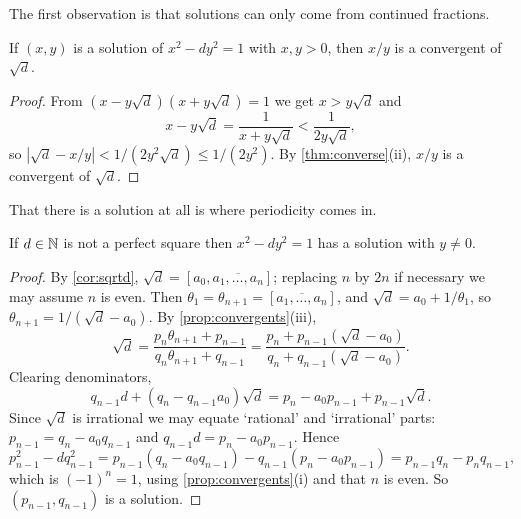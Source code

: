 \documentclass[a4paper]{scrartcl}
\begin{document}
The first observation is that solutions can only come from continued fractions.

\begin{proposition}\label{prop:pellconv}
	If $(x,y)$ is a solution of $x^2 - dy^2 = 1$ with $x, y > 0$, then $x/y$ is a convergent of $\sqrt d$.
\end{proposition}
\begin{proof}
	From $(x - y\sqrt d)(x+y\sqrt d) = 1$ we get $x > y\sqrt d$ and
	$$
	x - y\sqrt d = \frac1{x+y\sqrt d} < \frac1{2y\sqrt d},
	$$
	so $|\sqrt d - x/y| < 1/(2y^2\sqrt d) \leq 1/(2y^2)$. By \autoref{thm:converse}(ii), $x/y$ is a convergent of $\sqrt d$.
\end{proof}

That there is a solution at all is where periodicity comes in.

\begin{theorem}[Pell]\label{thm:pell}
	If $d \in \mathbb{N}$ is not a perfect square then $x^2 - dy^2 = 1$ has a solution with $y \neq 0$.
\end{theorem}
\begin{proof}
	By \autoref{cor:sqrtd}, $\sqrt d = [a_0, \overline{a_1, \dots, a_n}]$; replacing $n$ by $2n$ if necessary we may assume $n$ is even. Then $\theta_1 = \theta_{n+1} = [\overline{a_1, \dots, a_n}]$, and $\sqrt d = a_0 + 1/\theta_1$, so $\theta_{n+1} = 1/(\sqrt d - a_0)$. By \autoref{prop:convergents}(iii),
	$$
	\sqrt d = \frac{p_n\theta_{n+1}+p_{n-1}}{q_n\theta_{n+1}+q_{n-1}} = \frac{p_n + p_{n-1}(\sqrt d - a_0)}{q_n + q_{n-1}(\sqrt d - a_0)}.
	$$
	Clearing denominators,
	$$
	q_{n-1}d + (q_n - q_{n-1}a_0)\sqrt d = p_n - a_0p_{n-1} + p_{n-1}\sqrt d.
	$$
	Since $\sqrt d$ is irrational we may equate `rational' and `irrational' parts: $p_{n-1} = q_n - a_0q_{n-1}$ and $q_{n-1}d = p_n - a_0p_{n-1}$. Hence
	$$
	p_{n-1}^2 - dq_{n-1}^2 = p_{n-1}(q_n - a_0q_{n-1}) - q_{n-1}(p_n - a_0p_{n-1}) = p_{n-1}q_n - p_nq_{n-1},
	$$
	which is $(-1)^n = 1$,
	using \autoref{prop:convergents}(i) and that $n$ is even. So $(p_{n-1}, q_{n-1})$ is a solution.
\end{proof}
\end{document}
